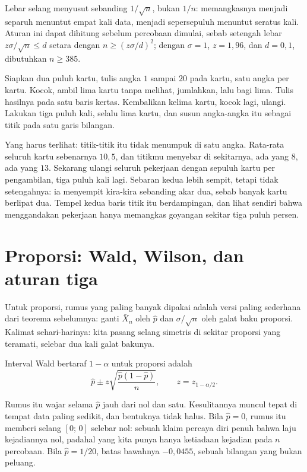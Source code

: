 Lebar selang menyusut sebanding $1/\sqrt n$, bukan $1/n$: memangkasnya menjadi separuh
menuntut empat kali data, menjadi sepersepuluh menuntut seratus kali. Aturan ini dapat
dihitung sebelum percobaan dimulai, sebab setengah lebar $z\sigma/\sqrt n\le d$ setara
dengan $n\ge(z\sigma/d)^2$; dengan $\sigma=1$, $z=1{,}96$, dan $d=0{,}1$, dibutuhkan
$n\ge385$.

\begin{tangan}
Siapkan dua puluh kartu, tulis angka $1$ sampai $20$ pada kartu, satu angka per kartu.
Kocok, ambil lima kartu tanpa melihat, jumlahkan, lalu bagi lima. Tulis hasilnya pada
satu baris kertas. Kembalikan kelima kartu, kocok lagi, ulangi. Lakukan tiga puluh kali,
selalu lima kartu, dan susun angka-angka itu sebagai titik pada satu garis bilangan.

Yang harus terlihat: titik-titik itu tidak menumpuk di satu angka. Rata-rata seluruh
kartu sebenarnya $10{,}5$, dan titikmu menyebar di sekitarnya, ada yang $8$, ada yang
$13$. Sekarang ulangi seluruh pekerjaan dengan sepuluh kartu per pengambilan, tiga puluh
kali lagi. Sebaran kedua lebih sempit, tetapi tidak setengahnya: ia menyempit kira-kira
sebanding akar dua, sebab banyak kartu berlipat dua. Tempel kedua baris titik itu
berdampingan, dan lihat sendiri bahwa menggandakan pekerjaan hanya memangkas goyangan
sekitar tiga puluh persen.
\end{tangan}

\section{Proporsi: Wald, Wilson, dan aturan tiga}

Untuk proporsi, rumus yang paling banyak dipakai adalah versi paling sederhana dari
teorema sebelumnya: ganti $\bar X_n$ oleh $\hat p$ dan $\sigma/\sqrt n$ oleh galat
baku proporsi. Kalimat sehari-harinya: kita pasang selang simetris di sekitar proporsi
yang teramati, selebar dua kali galat bakunya.

\begin{definisi}
Interval Wald bertaraf $1-\alpha$ untuk proporsi adalah
\[
\hat p\pm z\sqrt{\frac{\hat p(1-\hat p)}{n}},\qquad z=z_{1-\alpha/2}.
\]
\end{definisi}

Rumus itu wajar selama $\hat p$ jauh dari nol dan satu. Kesulitannya muncul tepat di
tempat data paling sedikit, dan bentuknya tidak halus. Bila $\hat p=0$, rumus itu
memberi selang $[0;\,0]$ selebar nol: sebuah klaim percaya diri penuh bahwa laju
kejadiannya nol, padahal yang kita punya hanya ketiadaan kejadian pada $n$ percobaan.
Bila $\hat p=1/20$, batas bawahnya $-0{,}0455$, sebuah bilangan yang bukan peluang.

